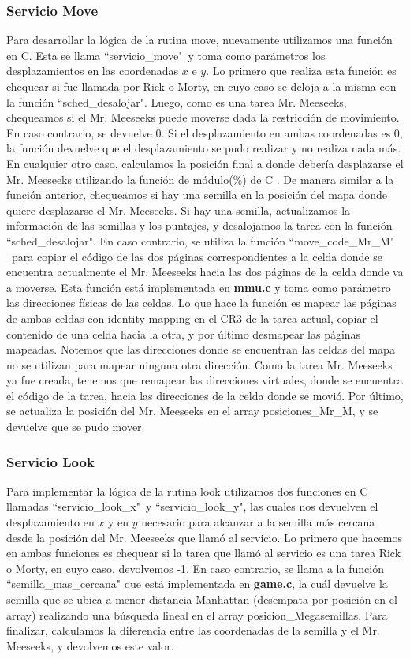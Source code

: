 \documentclass[a4paper]{article}
\begin{document}
\subsubsection{Servicio Move}
\justify
Para desarrollar la lógica de la rutina move, nuevamente utilizamos una función en C. Esta se llama ``servicio_move"\ y toma como parámetros los desplazamientos en las coordenadas $x$ e $y$. Lo primero que realiza esta función es chequear si fue llamada por Rick o Morty, en cuyo caso se deloja a la misma con la función ``sched_desalojar". Luego, como es una tarea Mr. Meeseeks, chequeamos si el Mr. Meeseeks puede moverse dada la restricción de movimiento. En caso contrario, se devuelve 0. Si el desplazamiento en ambas coordenadas es 0, la función devuelve que el desplazamiento se pudo realizar y no realiza nada más. En cualquier otro caso, calculamos la posición final a donde debería desplazarse el Mr. Meeseeks utilizando la función de módulo(\%) de C . De manera similar a la función anterior, chequeamos si hay una semilla en la posición del mapa donde quiere desplazarse el Mr. Meeseeks. Si hay una semilla, actualizamos la información de las semillas y los puntajes, y desalojamos la tarea con la función ``sched_desalojar". En caso contrario, se utiliza la función ``move_code_Mr_M" \ para copiar el código de las dos páginas correspondientes a la celda donde se encuentra actualmente el Mr. Meeseeks hacia las dos páginas de la celda donde va a moverse. Esta función está implementada en \textbf{mmu.c} y toma como parámetro las direcciones físicas de las celdas. Lo que hace la función es mapear las páginas de ambas celdas con identity mapping en el CR3 de la tarea actual, copiar el contenido de una celda hacia la otra, y por último desmapear las páginas mapeadas. Notemos que las direcciones donde se encuentran las celdas del mapa no se utilizan para mapear ninguna otra dirección. Como la tarea Mr. Meeseeks ya fue creada, tenemos que remapear las direcciones virtuales, donde se encuentra el código de la tarea, hacia las direcciones de la celda donde se movió. Por último, se actualiza la posición del Mr. Meeseeks en el array posiciones_Mr_M, y se devuelve que se pudo mover.

\subsubsection{Servicio Look}
\justify
Para implementar la lógica de la rutina look utilizamos dos funciones en C llamadas ``servicio_look_x"\ y ``servicio_look_y", las cuales nos devuelven el desplazamiento en $x$ y en $y$ necesario para alcanzar a la semilla más cercana desde la posición del Mr. Meeseeks que llamó al servicio. Lo primero que hacemos en ambas funciones es chequear si la tarea que llamó al servicio es una tarea Rick o Morty, en cuyo caso, devolvemos -1. En caso contrario, se llama a la función ``semilla_mas_cercana" que está implementada en \textbf{game.c}, la cuál devuelve la semilla que se ubica a menor distancia Manhattan (desempata por posición en el array) realizando una búsqueda lineal en el array posicion_Megasemillas. Para finalizar, calculamos la diferencia entre las coordenadas de la semilla y el Mr. Meeseeks, y devolvemos este valor.
\end{document}
